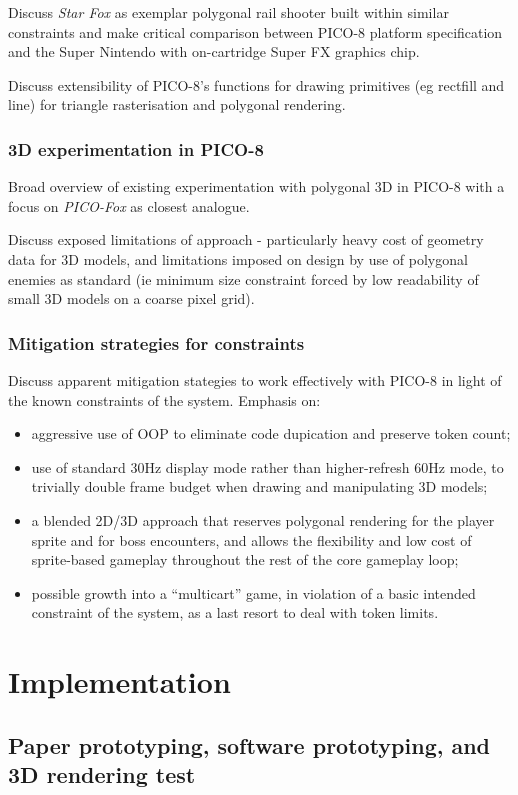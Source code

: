 \documentclass{article}
\begin{document}
Discuss \textit{Star Fox} as exemplar polygonal rail shooter built within similar
constraints and make critical comparison between PICO-8 platform specification and
the Super Nintendo with on-cartridge Super FX graphics chip.

Discuss extensibility of
PICO-8's functions for drawing primitives (eg rectfill and line) for triangle
rasterisation and polygonal rendering.
\subsubsection*{3D experimentation in PICO-8}
Broad overview of existing experimentation with polygonal 3D in PICO-8 with a
focus on \textit{PICO-Fox} as closest analogue. 

Discuss exposed limitations of approach - particularly heavy cost of geometry data
for 3D models, and limitations imposed on design by use of polygonal enemies as
standard (ie minimum size constraint forced by low readability of small 3D models
on a coarse pixel grid).
\subsubsection*{Mitigation strategies for constraints}
Discuss apparent mitigation stategies to work effectively with PICO-8 in light of
the known constraints of the system. Emphasis on:
\begin{itemize}
   \item aggressive use of OOP to eliminate code dupication and preserve token count;
   \item use of standard 30Hz display mode rather than higher-refresh 60Hz mode, to
   trivially double frame budget when drawing and manipulating 3D models;
   \item a blended 2D/3D approach that reserves polygonal rendering for the player
   sprite and for boss encounters, and allows the flexibility and low cost of
   sprite-based gameplay throughout the rest of the core gameplay loop;
   \item possible growth into a ``multicart'' game, in violation of a basic intended
   constraint of the system, as a last resort to deal with token limits.
\end{itemize}


\section{Implementation}

\subsection{Paper prototyping, software prototyping, and 3D rendering test}
\end{document}
